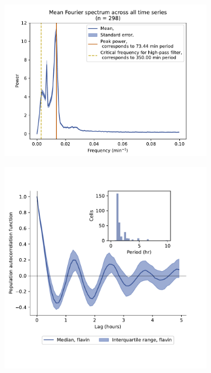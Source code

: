\begin{figure}
  \centering
  \begin{subfigure}[htpb]{0.45\textwidth}
   \centering
   \includegraphics[width=\textwidth]{by4741_491_13}
   \caption{
   }
   \label{fig:biology-by4741-sync-fourier}
  \end{subfigure}%
  \begin{subfigure}[htpb]{0.45\textwidth}
   \centering
   \includegraphics[width=\textwidth]{by4741_491_12}
   \caption{
   }
   \label{fig:biology-by4741-sync-acf}
  \end{subfigure}


\end{figure}
